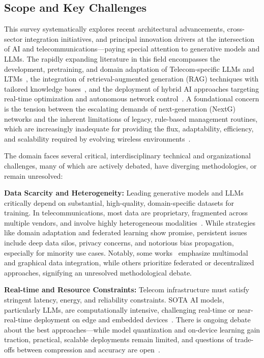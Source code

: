 \documentclass[sigconf]{acmart}
\begin{document}
\subsection{Scope and Key Challenges}

This survey systematically explores recent architectural advancements, cross-sector integration initiatives, and principal innovation drivers at the intersection of AI and telecommunications—paying special attention to generative models and LLMs. The rapidly expanding literature in this field encompasses the development, pretraining, and domain adaptation of Telecom-specific LLMs and LTMs~\cite{ref21, ref26, ref33}, the integration of retrieval-augmented generation (RAG) techniques with tailored knowledge bases~\cite{ref16, ref20, ref22, ref34}, and the deployment of hybrid AI approaches targeting real-time optimization and autonomous network control~\cite{ref19, ref49}. A foundational concern is the tension between the escalating demands of next-generation (NextG) networks and the inherent limitations of legacy, rule-based management routines, which are increasingly inadequate for providing the flux, adaptability, efficiency, and scalability required by evolving wireless environments~\cite{ref46, ref49}.

The domain faces several critical, interdisciplinary technical and organizational challenges, many of which are actively debated, have diverging methodologies, or remain unresolved:

\textbf{Data Scarcity and Heterogeneity:} Leading generative models and LLMs critically depend on substantial, high-quality, domain-specific datasets for training. In telecommunications, most data are proprietary, fragmented across multiple vendors, and involve highly heterogeneous modalities~\cite{ref21, ref46}. While strategies like domain adaptation and federated learning show promise, persistent issues include deep data silos, privacy concerns, and notorious bias propagation, especially for minority use cases. Notably, some works~\cite{ref21, ref22, ref46} emphasize multimodal and graphical data integration, while others prioritize federated or decentralized approaches, signifying an unresolved methodological debate.

\textbf{Real-time and Resource Constraints:} Telecom infrastructure must satisfy stringent latency, energy, and reliability constraints. SOTA AI models, particularly LLMs, are computationally intensive, challenging real-time or near-real-time deployment on edge and embedded devices~\cite{ref12, ref19, ref22, ref49}. There is ongoing debate about the best approaches—while model quantization and on-device learning gain traction, practical, scalable deployments remain limited, and questions of trade-offs between compression and accuracy are open~\cite{ref19, ref22}.
\end{document}
